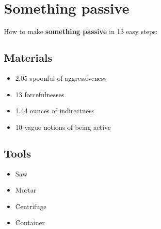 \documentclass{article}
\begin{document}
\section{Something passive}How to make \textbf{something passive} in 13 easy steps:

\subsection{Materials}\begin{itemize}
\item 
2.05 spoonful of aggressiveness
\item 
13 forcefulnesses
\item 
1.44 ounces of indirectness
\item 
10 vague notions of being active
\end{itemize}
\subsection{Tools}\begin{itemize}
\item 
Saw
\item 
Mortar
\item 
Centrifuge
\item 
Container
\end{itemize}
\end{document}
